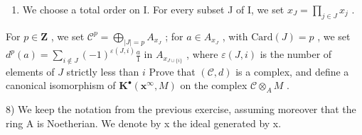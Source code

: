 \begin{enumerate}
\def\labelenumi{\alph{enumi})}
\setcounter{enumi}{1}
\tightlist
\item
  We choose a total order on I. For every subset J of I, we set \(x_{J} = \prod_{j \in J} x_{j}\) .
\end{enumerate}

For \(p \in \mathbf{Z}\) , we set \(\mathcal{C}^p = \bigoplus_{|J| = p} A_{x_J}\) ; for \(a \in A_{x_J}\) , with \(\text{Card}(J) = p\) , we set \(d^p(a) = \sum_{i \notin J} (-1)^{\varepsilon(J, i)} \frac{a}{1}\) in \(A_{x_{J \cup \{i\}}}\) , where \(\varepsilon(J, i)\) is the number of elements of \(J\) strictly less than \(i\) Prove that \((\mathcal{C}, d)\) is a complex, and define a canonical isomorphism of \(\mathbf{K}^\bullet(\mathbf{x}^\infty, M)\) on the complex \(\mathcal{C} \otimes_A M\) .

8) We keep the notation from the previous exercise, assuming moreover that the ring A is Noetherian. We denote by x the ideal generated by x.

